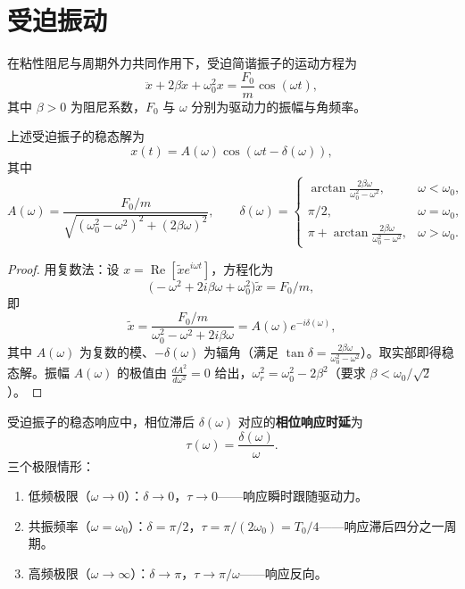 \section{受迫振动}

\begin{definition}[受迫简谐振子]\label{def:forced_oscillator}
在粘性阻尼与周期外力共同作用下，受迫简谐振子的运动方程为
\[
\ddot{x} + 2\beta\dot{x} + \omega_0^2 x = \frac{F_0}{m}\cos(\omega t),
\]
其中 $\beta > 0$ 为阻尼系数，$F_0$ 与 $\omega$ 分别为驱动力的振幅与角频率。
\end{definition}

\begin{theorem}\label{thm:resonance}
上述受迫振子的稳态解为
\[
x(t) = A(\omega)\cos(\omega t - \delta(\omega)),
\]
其中
\[
A(\omega) = \frac{F_0/m}{\sqrt{(\omega_0^2 - \omega^2)^2 + (2\beta\omega)^2}}, \qquad \delta(\omega) = \begin{cases} \arctan\frac{2\beta\omega}{\omega_0^2 - \omega^2}, & \omega < \omega_0, \\ \pi/2, & \omega = \omega_0, \\ \pi + \arctan\frac{2\beta\omega}{\omega_0^2 - \omega^2}, & \omega > \omega_0. \end{cases}
\]
\end{theorem}

\begin{proof}
用复数法：设 $x = \operatorname{Re}[\tilde x e^{i\omega t}]$，方程化为
\[
\big(-\omega^2 + 2i\beta\omega + \omega_0^2\big)\tilde x = F_0/m,
\]
即
\[
\tilde x = \frac{F_0/m}{\omega_0^2 - \omega^2 + 2i\beta\omega} = A(\omega) e^{-i\delta(\omega)},
\]
其中 $A(\omega)$ 为复数的模、$-\delta(\omega)$ 为辐角（满足 $\tan\delta = \frac{2\beta\omega}{\omega_0^2-\omega^2}$）。取实部即得稳态解。振幅 $A(\omega)$ 的极值由 $\frac{dA^2}{d\omega^2} = 0$ 给出，$\omega_r^2 = \omega_0^2 - 2\beta^2$（要求 $\beta < \omega_0/\sqrt{2}$）。
\end{proof}

\begin{definition}[受迫振子的相位响应时延]\label{def:forced_phase_delay}
受迫振子的稳态响应中，相位滞后 $\delta(\omega)$ 对应的\textbf{相位响应时延}为
\[
\tau(\omega) = \frac{\delta(\omega)}{\omega}.
\]
三个极限情形：
\begin{enumerate}[label=(\roman*)]
    \item 低频极限（$\omega \to 0$）：$\delta \to 0$，$\tau \to 0$——响应瞬时跟随驱动力。
    \item 共振频率（$\omega = \omega_0$）：$\delta = \pi/2$，$\tau = \pi/(2\omega_0) = T_0/4$——响应滞后四分之一周期。
    \item 高频极限（$\omega \to \infty$）：$\delta \to \pi$，$\tau \to \pi/\omega$——响应反向。
\end{enumerate}
\end{definition}

